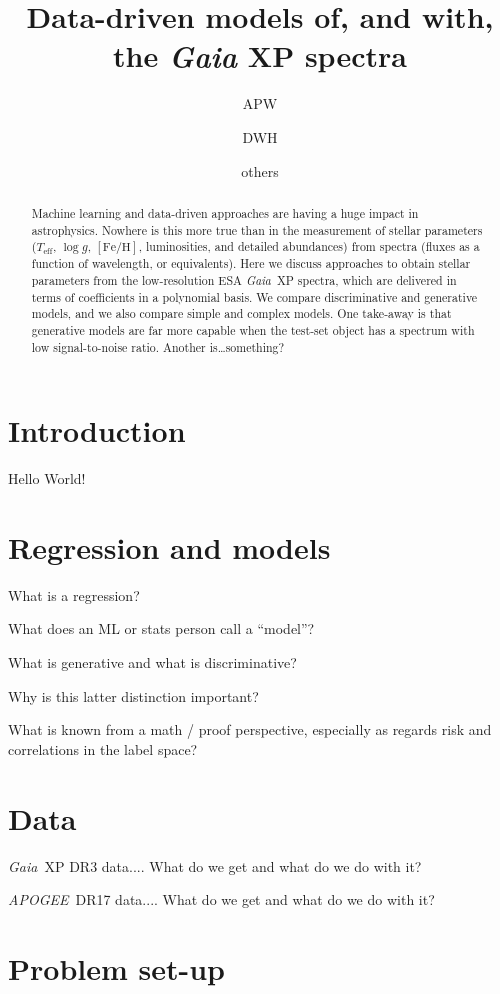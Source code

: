 \documentclass[modern]{aastex631}
\newcommand{\acronym}[1]{\small{#1}}
\newcommand{\project}[1]{\textsl{#1}}
\newcommand{\Gaia}{\project{Gaia}}
\newcommand{\APOGEE}{\project{\acronym{APOGEE}}}
\newcommand{\teff}{{T_{\mathrm{eff}}}}
\newcommand{\logg}{\log g}
\newcommand{\feh}{[\mathrm{Fe}/\mathrm{H}]}
\begin{document}
\title{Data-driven models of, and with, the \textsl{Gaia} XP spectra}

\author{APW}
\author{DWH}
\author{others}

\begin{abstract}\noindent %
  Machine learning and data-driven approaches are having a huge impact in astrophysics.
  Nowhere is this more true than in the measurement of stellar parameters ($\teff$, $\logg$, $\feh$, luminosities, and detailed abundances) from spectra (fluxes as a function of wavelength, or equivalents).
  Here we discuss approaches to obtain stellar parameters from the low-resolution ESA \Gaia\ XP spectra, which are delivered in terms of coefficients in a polynomial basis.
  We compare discriminative and generative models, and we also compare simple and complex models.
  One take-away is that generative models are far more capable when the test-set object has a spectrum with low signal-to-noise ratio.
  Another is\ldots something?
\end{abstract}

\section{Introduction} \label{sec:intro}

Hello World!

\section{Regression and models}

What is a regression?

What does an ML or stats person call a ``model''?

What is generative and what is discriminative?

Why is this latter distinction important?

What is known from a math / proof perspective, especially as regards risk and correlations in the label space?

\section{Data}

\Gaia\ XP DR3 data.... What do we get and what do we do with it?

\APOGEE\ DR17 data.... What do we get and what do we do with it?

\section{Problem set-up}
\end{document}
